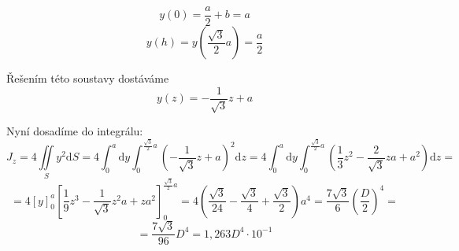 \documentclass{article}
\begin{document}
\[ y(0)=\frac{a}{2}+b = a\] 
\[ y(h)=y\left(\frac{\sqrt{3}}{2}a\right)=\frac{a}{2}\]

Řešením této soustavy dostáváme
\[ y(z)=-\frac{1}{\sqrt{3}}z+a \]

Nyní dosadíme do integrálu:
\[ J_z=4\iint\limits_{S} y^2\mathrm{d}S = 4\int_{0}^{a}\mathrm{d}y \int_{0}^{\frac{\sqrt{3}}{2}a} \left(-\frac{1}{\sqrt{3}}z+a\right)^2\mathrm{d}z 
= 4\int_{0}^{a}\mathrm{d}y \int_{0}^{\frac{\sqrt{3}}{2}a} \left(\frac{1}{3}z^2-\frac{2}{\sqrt{3}}za+a^2\right)\mathrm{d}z=\]
\[= 4\left[ y\right]_0^{a} \left[ \frac{1}{9}z^3-\frac{1}{\sqrt{3}}z^2a+za^2\right]_0^{\frac{\sqrt{3}}{2}a} = 4\left(\frac{\sqrt{3}}{24} -\frac{\sqrt{3}}{4}+ \frac{\sqrt{3}}{2}\right)a^4
= \frac{7\sqrt{3}}{6} \left(\frac{D}{2}\right)^4 =\] 
\[= \frac{7\sqrt{3}}{96} D^4 = 1,263 D^4 \cdot 10^{-1}\]
\end{document}
